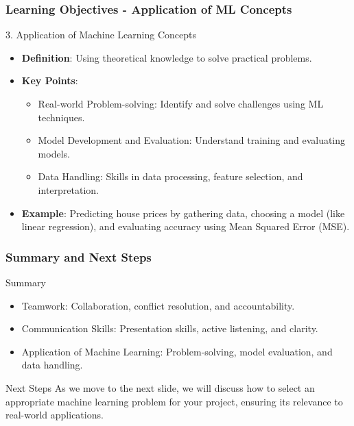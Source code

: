 \documentclass{beamer}
\begin{document}
\begin{frame}[fragile]
    \frametitle{Learning Objectives - Application of ML Concepts}
    \begin{block}{3. Application of Machine Learning Concepts}
        \begin{itemize}
            \item \textbf{Definition}: Using theoretical knowledge to solve practical problems.
            \item \textbf{Key Points}:
            \begin{itemize}
                \item Real-world Problem-solving: Identify and solve challenges using ML techniques.
                \item Model Development and Evaluation: Understand training and evaluating models.
                \item Data Handling: Skills in data processing, feature selection, and interpretation.
            \end{itemize}
            \item \textbf{Example}: Predicting house prices by gathering data, choosing a model (like linear regression), and evaluating accuracy using Mean Squared Error (MSE).
        \end{itemize}
    \end{block}
\end{frame}

\begin{frame}[fragile]
    \frametitle{Summary and Next Steps}
    \begin{block}{Summary}
        \begin{itemize}
            \item Teamwork: Collaboration, conflict resolution, and accountability.
            \item Communication Skills: Presentation skills, active listening, and clarity.
            \item Application of Machine Learning: Problem-solving, model evaluation, and data handling.
        \end{itemize}
    \end{block}
    
    \begin{block}{Next Steps}
        As we move to the next slide, we will discuss how to select an appropriate machine learning problem for your project, ensuring its relevance to real-world applications.
    \end{block}
\end{frame}
\end{document}
